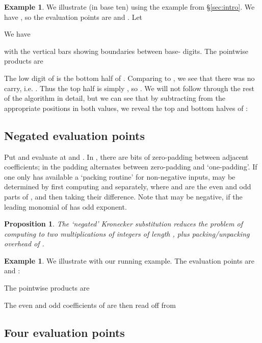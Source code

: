 \documentclass{amsart}
\newtheorem{prop}[thm]{Proposition}
\theoremstyle{definition}
\newtheorem{example}[thm]{Example}
\theoremstyle{remark}
\begin{document}
\begin{example}
We illustrate (in base ten) using the example from \S\ref{sec:intro}. We have , so the evaluation points are  and . Let

We have

with the vertical bars showing boundaries between base- digits.
The pointwise products are

The low digit  of  is the bottom half  of . Comparing  to , we see that there was no carry, i.e. . Thus the top half  is simply , so . We will not follow through the rest of the algorithm in detail, but we can see that by subtracting  from the appropriate positions in both values, we reveal the top and bottom halves of :


\end{example}


\subsection{Negated evaluation points}
\label{sec:integer-negate}

Put  and evaluate at  and . In , there are  bits of zero-padding between adjacent coefficients; in  the padding alternates between zero-padding and `one-padding'. If one only has available a `packing routine' for non-negative inputs,  may be determined by first computing  and  separately, where  and  are the even and odd parts of , and then taking their difference. Note that  may be negative, if the leading monomial of  has odd exponent.

\begin{prop}
\label{prop:integer-negate-ks}
The `negated' Kronecker substitution reduces the problem of computing  to two multiplications of integers of length , plus packing/unpacking overhead of .
\end{prop}

\begin{example}
We illustrate with our running example. The evaluation points are  and :

The pointwise products are

The even and odd coefficients of  are then read off from

\end{example}


\subsection{Four evaluation points}
\label{sec:integer-four}
\end{document}
